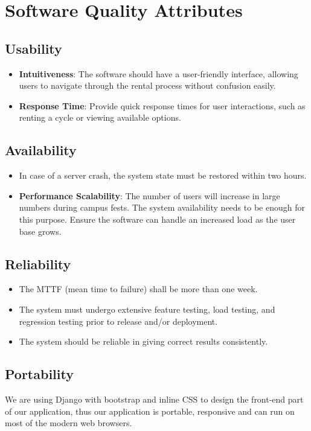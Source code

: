 \documentclass{scrreprt}
\begin{document}
\section{Software Quality Attributes}
\subsection{Usability}
\begin{itemize}
    \item \textbf{Intuitiveness}: The software should have a user-friendly interface, allowing users to navigate through the rental process without confusion easily.
    \item \textbf{Response Time}: Provide quick response times for user interactions, such as renting a cycle or viewing available options.
\end{itemize}

\subsection{Availability}
\begin{itemize}
    \item In case of a server crash, the system state must be restored within two hours.
    \item \textbf{Performance Scalability}: The number of users will increase in large numbers during campus fests. The system availability needs to be enough for this purpose. Ensure the software can handle an increased load as the user base grows.
\end{itemize}
\subsection{Reliability}
\begin{itemize}
    \item The MTTF (mean time to failure) shall be more than one week.
    \item The system must undergo extensive feature testing, load testing, and regression testing prior to release and/or deployment.
    \item The system should be reliable in giving correct results consistently.
\end{itemize}

\subsection{Portability}
We are using Django with bootstrap and inline CSS to design the front-end part of our application, thus our application is portable, responsive and can run on most of the modern web browsers.
\end{document}
